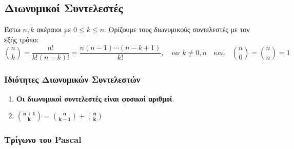 \documentclass[a4paper,table]{report}
\begin{document}
\setcounter{chapter}{1}

\begin{center}
  \minibox{\large \bfseries \textcolor{Col1}{Διωνυμικό Ανάπτυγμα}}
\end{center}


\subsection*{Διωνυμικοί Συντελεστές}

\begin{mybox1}
  \begin{dfn}
    Έστω $ n,k $ ακέραιοι με $ 0 \leq k \leq n $. Ορίζουμε τους 
    \textcolor{Col1}{διωνυμικούς συντελεστές} με τον εξής τρόπο: 
    \[
      \binom{n}{k} = \frac{n!}{k!(n-k)!} = \frac{n(n-1)\cdots (n-k+1)}{k!}, \quad
      \text{αν } k \neq 0,n 
      \quad \text{και} \quad \binom{n}{0} = \binom{n}{n} = 1 
    \] 
  \end{dfn}
\end{mybox1}

\subsubsection*{Ιδιότητες Διωνυμικών Συντελεστών}

\begin{enumerate}
  \item \textbf{Οι διωνυμικοί συντελεστές είναι φυσικοί αριθμοί}.
  \item \label{it:idiii} 
    $ \bm{\binom{n+1}{k} = \binom{n}{k-1} + \binom{n}{k}} $

\end{enumerate}

\enlargethispage{2\baselineskip}

\subsubsection*{Τρίγωνο του Pascal}
\end{document}
